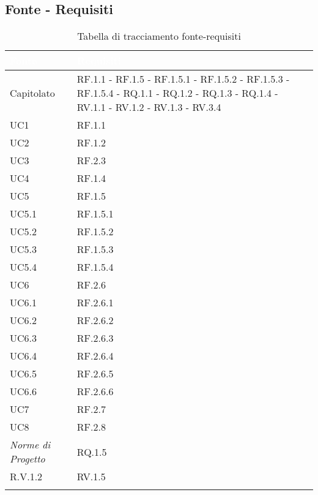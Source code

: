 \subsection{Fonte - Requisiti}
\begin{center}
  \centering
  \begin{longtable}{|C{6cm}|C{6cm}|}
    \hline
    \textcolor[HTML]{FFFFFF}{\textbf{Fonte}} & \textcolor[HTML]{FFFFFF}{\textbf{Requisiti}} \\ \hline
    Capitolato & RF.1.1 - RF.1.5 - RF.1.5.1 - RF.1.5.2 - RF.1.5.3 - RF.1.5.4 - RQ.1.1 - RQ.1.2 - RQ.1.3 - RQ.1.4 - RV.1.1 - RV.1.2 - RV.1.3 - RV.3.4 \\ \hline
    UC1 & RF.1.1 \\ \hline
    UC2 & RF.1.2 \\ \hline
    UC3 & RF.2.3 \\ \hline
    UC4 & RF.1.4 \\ \hline
    UC5 & RF.1.5 \\ \hline
    UC5.1 & RF.1.5.1 \\ \hline
    UC5.2 & RF.1.5.2 \\ \hline
    UC5.3 & RF.1.5.3 \\ \hline
    UC5.4 & RF.1.5.4 \\ \hline
    UC6 & RF.2.6 \\ \hline
    UC6.1 & RF.2.6.1 \\ \hline
    UC6.2 & RF.2.6.2 \\ \hline
    UC6.3 & RF.2.6.3 \\ \hline
    UC6.4 & RF.2.6.4 \\ \hline
    UC6.5 & RF.2.6.5 \\ \hline
    UC6.6 & RF.2.6.6 \\ \hline
    UC7 & RF.2.7 \\ \hline
    UC8 & RF.2.8 \\ \hline
    \textit{Norme di Progetto} & RQ.1.5 \\ \hline
    R.V.1.2 & RV.1.5 \\ \hline

    \caption{Tabella di tracciamento fonte-requisiti}
  \end{longtable}
\end{center}

